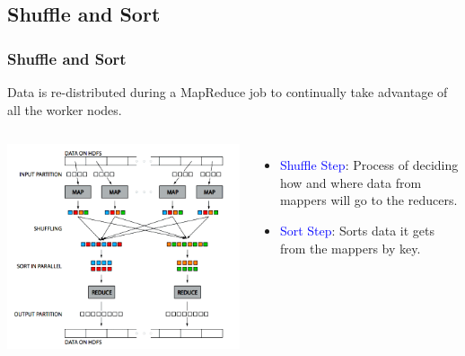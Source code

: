 \documentclass{beamer}
\begin{document}
\subsection{Shuffle and Sort}
\begin{frame}
  \frametitle{Shuffle and Sort}
  \parbox{\linewidth}{Data is re-distributed during a MapReduce job to continually take advantage of all the worker nodes.}
  \vspace{2mm}

  \begin{columns}
    \begin{center}
      \includegraphics[width=\textwidth]{../images/shuffle_sort.png}
    \end{center}
    \begin{itemize}
      \item \textcolor{blue}{Shuffle Step}: Process of deciding how and where data from mappers will go to the reducers.
      \vspace{1mm}
    \item \textcolor{blue}{Sort Step}: Sorts data it gets from the mappers by key.
    \end{itemize}
  \end{columns}
\end{frame}
\end{document}
